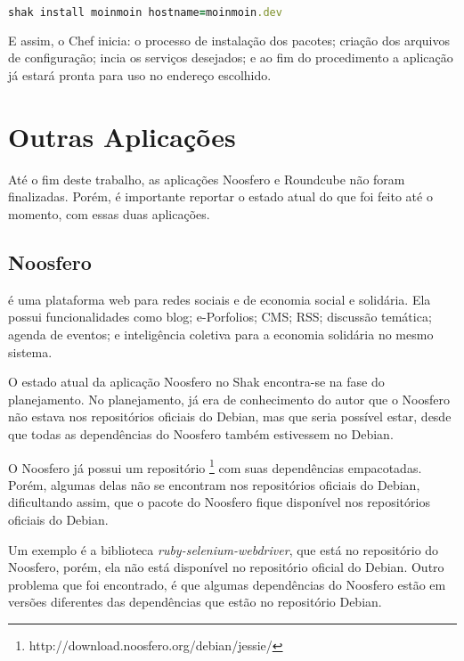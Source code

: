 \begin{lstlisting}[language=Ruby,label=dice_index,caption={Exemplo de execução de instalação do owncloud com shak}]
shak install moinmoin hostname=moinmoin.dev
\end{lstlisting}

E assim, o Chef inicia: o processo de instalação dos pacotes; criação dos arquivos
de configuração; incia os serviços desejados; e ao fim do procedimento a aplicação
já estará pronta para uso no endereço escolhido.

\section{Outras Aplicações}
\label{sub:appnencerradas}

Até o fim deste trabalho, as aplicações Noosfero e Roundcube não foram finalizadas. 
Porém, é importante reportar o estado atual do que foi feito até o momento,
com essas duas aplicações.

\subsection{Noosfero}
\label{subsub:noosfero}

 é uma plataforma web para redes sociais e 
de economia social e solidária. Ela possui funcionalidades como blog; e-Porfolios; 
CMS; RSS; discussão temática; agenda de eventos; e inteligência coletiva para a 
economia solidária no mesmo sistema.

O estado atual da aplicação Noosfero no Shak encontra-se
na fase do planejamento. No planejamento, já era de conhecimento do autor que o
Noosfero não estava nos repositórios oficiais do Debian, mas que seria possível estar, 
desde que todas as dependências do Noosfero também estivessem no Debian.

O Noosfero já possui um repositório \footnote{http://download.noosfero.org/debian/jessie/}
com suas dependências empacotadas. Porém, algumas delas não se encontram nos repositórios
oficiais do Debian, dificultando assim, que o pacote do Noosfero fique disponível
nos repositórios oficiais do Debian. 

Um exemplo é a biblioteca \textit{ruby-selenium-webdriver}, que
está no repositório do Noosfero, porém, ela não está disponível no repositório oficial
do Debian. Outro problema que foi encontrado, é que algumas dependências do Noosfero
estão em versões diferentes das dependências que estão no repositório Debian.


